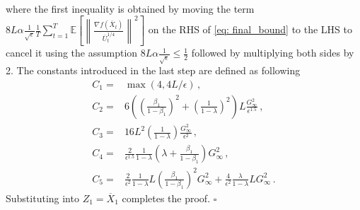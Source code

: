 \documentclass[anon,12pt]{colt2021} %
\begin{document}
\begin{align}
\end{align}
where the first inequality is obtained by moving the term ${8L}\alpha\frac{1}{\sqrt{\epsilon}} \frac{1}{T} \sum_{t=1}^T \mathbb E \left[  \left\| \frac{\nabla f(\overline X_{t})}{{\overline U_t^{1/4}}  } \right\|^2 \right] $ on the RHS of \eqref{eq: final_bound} to the LHS to cancel it using the assumption ${8L}\alpha\frac{1}{\sqrt{\epsilon}} \leq \frac{1}{2} $ followed by multiplying both sides by 2.
The constants introduced in the last step are defined as following
\begin{align}
C_1 = & \max (4, 4{L/\epsilon}) \nonumber \, ,\\
C_2 = & 6 \left(\left( \frac{\beta_1}{1-\beta_1}\right)^2 + \left (\frac{1}{1-\lambda} \right)^2 \right)L  \frac{G_{\infty}^2 }{\epsilon^{1.5}}   \nonumber \, ,\\
C_3 = & 16L^2 \left ( \frac{1}{1-\lambda}\right) \frac{G_{\infty}^2}{\epsilon^2} \nonumber \, ,\\
C_4 = &  \frac{2}{ \epsilon^{1.5}}   \frac{1}{1-\lambda}  \left(     \lambda + \frac{\beta_1}{1-\beta_1}    \right){G_{\infty}^2} \nonumber \, ,\\
C_5 = &  \frac{2}{ \epsilon^{2}}   \frac{1}{1-\lambda}   L   \left ( \frac{\beta_1}{1-\beta_1} \right)^2 {G_{\infty}^2}  + \frac{4}{ \epsilon^{2}}   \frac{\lambda}{1-\lambda}   L    {G_{\infty}^2} \nonumber \, .
\end{align}
Substituting into $Z_1 = \overline X_1$ completes the proof. \hfill $\square$
\end{document}
